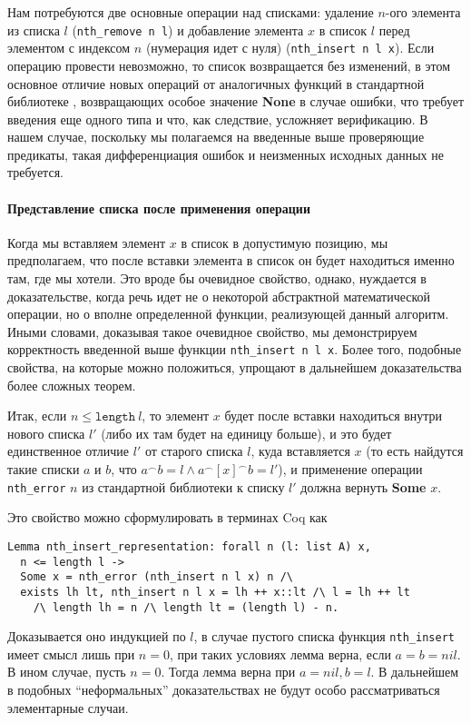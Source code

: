 Нам потребуются две основные операции над списками: удаление $n$-ого элемента из списка $l$ (\texttt{nth\_remove n l}) и добавление элемента $x$ в список $l$ перед элементом с индексом $n$ (нумерация идет с нуля) (\texttt{nth\_insert n l x}). Если операцию провести невозможно, то список возвращается без изменений, в этом основное отличие новых операций от аналогичных функций в стандартной библиотеке \tcoq, возвращающих особое значение \textbf{None} в случае ошибки, что требует введения еще одного типа и что, как следствие, усложняет верификацию. В нашем случае, поскольку мы полагаемся на введенные выше проверяющие предикаты, такая дифференциация ошибок и неизменных исходных данных не требуется.

\paragraph{Представление списка после применения операции} Когда мы вставляем элемент $x$ в список в допустимую позицию, мы предполагаем, что после вставки элемента в список он будет находиться именно там, где мы хотели. Это вроде бы очевидное свойство, однако, нуждается в доказательстве, когда речь идет не о некоторой абстрактной математической операции, но о вполне определенной функции, реализующей данный алгоритм. Иными словами, доказывая такое очевидное свойство, мы демонстрируем корректность введенной выше функции \texttt{nth\_insert n l x}. Более того, подобные свойства, на которые можно положиться, упрощают в дальнейшем доказательства более сложных теорем.

Итак, если $n \leq \texttt{length}\ l$, то элемент $x$ будет после вставки находиться внутри нового списка $l'$ (либо их там будет на единицу больше), и это будет единственное отличие $l'$ от старого списка $l$, куда вставляется $x$ (то есть найдутся такие списки $a$ и $b$, что $a^\frown  b = l \wedge a^\frown [x]^\frown b = l'$),  и применение операции \texttt{nth\_error} $n$ из стандартной библиотеки к списку $l'$ должна вернуть \textbf{Some} $x$.

Это свойство можно сформулировать в терминах Coq как
\begin{lstlisting}
Lemma nth_insert_representation: forall n (l: list A) x,
  n <= length l ->
  Some x = nth_error (nth_insert n l x) n /\
  exists lh lt, nth_insert n l x = lh ++ x::lt /\ l = lh ++ lt
    /\ length lh = n /\ length lt = (length l) - n.
 \end{lstlisting}

Доказывается оно индукцией по $l$, в случае пустого списка функция \texttt{nth\_insert} имеет смысл лишь при $n = 0$, при таких условиях лемма верна, если $a = b = nil$. В ином случае, пусть $n = 0$. Тогда лемма верна при $a = nil, b = l$. В дальнейшем в подобных ``неформальных''  доказательствах не будут особо рассматриваться элементарные случаи.

